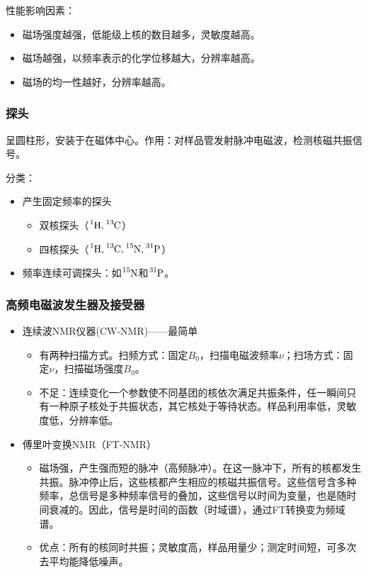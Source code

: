 性能影响因素：
\begin{itemize}
	\item 磁场强度越强，低能级上核的数目越多，灵敏度越高。
	\item 磁场越强，以频率表示的化学位移越大，分辨率越高。
	\item 磁场的均一性越好，分辨率越高。
\end{itemize}

\subsubsection{探头}
呈圆柱形，安装于在磁体中心。作用：对样品管发射脉冲电磁波，检测核磁共振信号。

分类：
\begin{itemize}
	\item 产生固定频率的探头
	\begin{itemize}
		\item 双核探头（$\ce{^{1}H,^{13}C}$）
		\item 四核探头（$\ce{^{1}H,^{13}C,^{15}N,^{31}P}$）
	\end{itemize}
	\item 频率连续可调探头：如$\ce{^{15}N}$和$\ce{^{31}P}$。
\end{itemize}

\subsubsection{高频电磁波发生器及接受器}
\begin{itemize}
	\item 连续波NMR仪器(CW-NMR)——最简单
	\begin{itemize}
		\item 有两种扫描方式。扫频方式：固定$B_0$，扫描电磁波频率$\nu$；扫场方式：固定$\nu$，扫描磁场强度$B_0$。
		\item 不足：连续变化一个参数使不同基团的核依次满足共振条件，任一瞬间只有一种原子核处于共振状态，其它核处于等待状态。样品利用率低，灵敏度低，分辨率低。
	\end{itemize}
	\item 傅里叶变换NMR（FT-NMR）
	\begin{itemize}
		\item 磁场强，产生强而短的脉冲（高频脉冲）。在这一脉冲下，所有的核都发生共振。脉冲停止后，这些核都产生相应的核磁共振信号。这些信号含多种频率，总信号是多种频率信号的叠加，这些信号以时间为变量，也是随时间衰减的。因此，信号是时间的函数（时域谱），通过FT转换变为频域谱。
		\item 优点：所有的核同时共振；灵敏度高，样品用量少；测定时间短，可多次去平均能降低噪声。
	\end{itemize}
\end{itemize}


